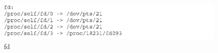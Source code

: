 \begin{figure}[H]
    \includegraphics[scale=0.5]{images/fd.png}
    \caption{fd}\label{img:fd}
\end{figure}

